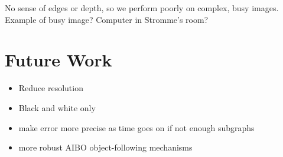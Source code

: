 \documentclass{article}
\renewcommand{\|}{\origbar} %
\begin{document}
No sense of edges or depth, so we perform poorly on complex, busy images. Example of busy image? Computer in Stromme's room?

\section{Future Work}

\begin{itemize}
  \item Reduce resolution
  \item Black and white only
  \item make error more precise as time goes on if not enough subgraphs
  \item more robust AIBO object-following mechanisms
\end{itemize}
\end{document}
